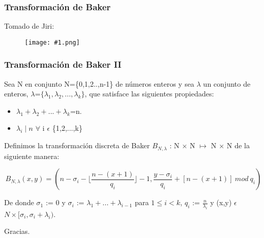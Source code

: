 \documentclass{beamer}
\newcommand{\IncludeImage}[4]{
  \begin{figure}[ht!]
    \centering
      \texttt{[image: \#1.png]}
  \end{figure}
}
\begin{document}
\begin{frame}
\frametitle{Transformaci\'on de Baker}
Tomado de Jiri:
 \IncludeImage{./images/j}{70}{imagen tomada de Jiri}{b}
\end{frame}

\begin{frame}
\frametitle{ Transformaci\'on de Baker II}
  Sea N en conjunto N=\{0,1,2..,n-1\} de n\'umeros enteros y sea $\lambda$ un conjunto de enteros, $\lambda$=$\{\lambda_{1}, \lambda_{2},...,\lambda_{k}\}$, que satisface las siguientes propiedades:

\begin{itemize}
	\item $\lambda_{1}+\lambda_{2}+...+\lambda_{k}$=n.
	\item $\lambda_{i}\mid n$ $\forall$ i $\epsilon$ \{1,2,...,k\}
\end{itemize}

Definimos la transformaci\'on discreta de Baker $B_{N,\lambda}$ : N $\times$ N $\longmapsto$ N $\times$ N de la siguiente manera:

\begin{equation}
  B_{N,\lambda}(x,y) = ( n - \sigma_{i} - \lfloor\frac{n-(x+1)}{q_{i}}\rfloor -1 , \frac{y-\sigma_{i}}{q_{i}} + [n-(x+1)] \ mod \ q_{i} ) 
\end{equation}

De donde $\sigma_{1}$ := 0 y $\sigma_{i}$ := $\lambda_{1}+...+\lambda_{i-1}$ para $1 \leq i < k$, $q_{i}$ := $\frac{n}{\lambda_{i}}$ y (x,y) $\epsilon$ $ N \times [\sigma_{i},\sigma_{i}+\lambda_{i})$.

\end{frame}

\begin{frame}
 Gracias.
\end{frame}
\end{document}
